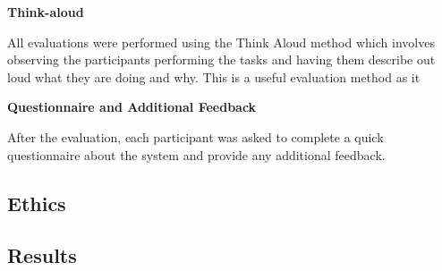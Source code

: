 \documentclass{l3proj}
\begin{document}
\textbf{Think-aloud}

All evaluations were performed using the Think Aloud method which involves observing the participants performing the tasks and having them describe out loud what they are doing and why. This is a useful evaluation method as it


\textbf{Questionnaire and Additional Feedback}

After the evaluation, each participant was asked to complete a quick questionnaire about the system and provide any additional feedback. 

\subsection{Ethics}

\subsection{Results}
\end{document}
